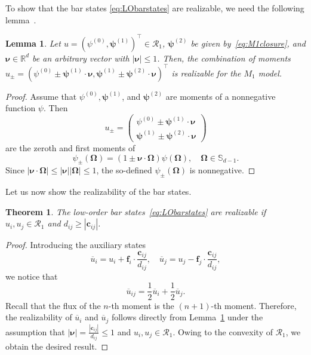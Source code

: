 \documentclass[preprint, 11pt]{elsarticle}
\newcommand{\R}{\mathbb{R}}
\newcommand{\f}{\mathbf{f}}
\newcommand{\con}{\mathbf{c}}
\newcommand{\Sp}{\mathbb{S}_{d-1}}
\newcommand{\OO}{\bm{\Omega}}
\newcommand{\pz}{\psi^{(0)}}
\newcommand{\po}{\boldsymbol{\psi}^{(1)}}
\newcommand{\pt}{\boldsymbol{\psi}^{(2)}}
\newtheorem{theorem}{Theorem}
\newtheorem{lemma}{Lemma}
\begin{document}
To show that the bar states \eqref{eq:LObarstates} are realizable, we need the following lemma~\cite[Lem. 4.1]{chidyagwai2018}.
\begin{lemma}\label{lem:upm}
    Let $u = (\pz,\po)^\top\in\mathcal{R}_1$, $\pt$ be given by~\eqref{eq:M1closure}, and $\bm\nu\in\R^d$ be an arbitrary vector with $|\bm\nu|\leq 1$. 
    Then, the combination of moments
    $u_\pm = (\pz\pm \po\cdot \bm\nu, \po\pm \pt\cdot\bm\nu)^\top$ is realizable
    for the $M_1$ model. 
\end{lemma}
\begin{proof}
    Assume that $\pz, \po$, and $\pt$ are moments of a nonnegative function $\psi$.
    Then 
    \begin{equation*}
        u_\pm = \left(\begin{array}{cc}
             \pz\pm \po\cdot \bm\nu \\
             \po\pm \pt\cdot\bm\nu
        \end{array}\right)
    \end{equation*}
    are the zeroth and first moments of 
    \begin{equation*}
        \psi_\pm(\OO) = (1\pm \bm\nu\cdot \OO)\psi(\OO),\quad \OO\in\Sp.
    \end{equation*}
    Since $|\bm\nu\cdot \OO|\leq |\bm\nu||\OO|\leq 1$, the so-defined
    $\psi_\pm(\OO)$ is nonnegative.
\end{proof}
Let us now show the realizability of the bar states.
\begin{theorem}\label{thm:IDPbarstates}
    The low-order bar states~\eqref{eq:LObarstates} are realizable if $u_i, u_j\in\mathcal{R}_1$ and $d_{ij}\geq |\con_{ij}|$.
\end{theorem}
\begin{proof}
  Introducing the auxiliary states
   \begin{equation}\label{eq:uibar}
        \overline{u}_i = u_i + \f_i\cdot \frac{\con_{ij}}{d_{ij}}, \quad 
        \overline{u}_j = u_j - \f_j\cdot \frac{\con_{ij}}{d_{ij}},
   \end{equation}
   we notice that
    \begin{equation}\label{eq:barstatesplit}
        \overline u_{ij} = \frac{1}{2}\overline{u}_i + \frac{1}{2}\overline{u}_j.
    \end{equation}
    Recall that the flux of the $n$-th moment is the $(n+1)$-th moment. 
    Therefore, the realizability of $\overline{u}_i$ and $\overline{u}_j$ follows directly from Lemma~\ref{lem:upm} under the assumption that $|\bm\nu| = \frac{|\con_{ij}|}{d_{ij}}\leq 1$ and $u_i,u_j\in\mathcal{R}_1$.
    Owing to the convexity of $\mathcal{R}_1$, we obtain the desired result.
\end{proof}
\end{document}
